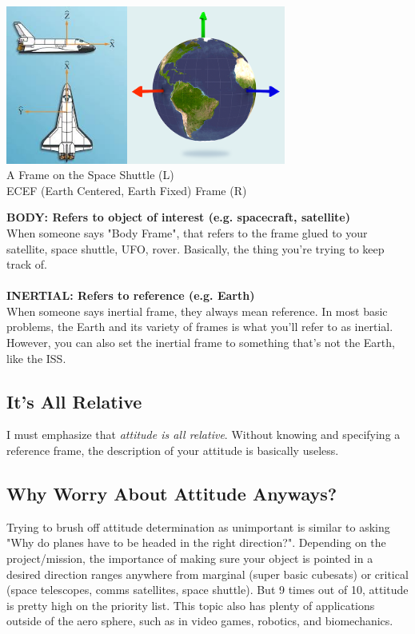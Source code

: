 \documentclass[a4paper,14pt]{extreport}
\begin{document}
\begin{center}
\includegraphics[width=4cm]{shuttle_body_frame}\includegraphics[height=5.2cm]{ecef}\\
A Frame on the Space Shuttle (L) \\ ECEF (Earth Centered, Earth Fixed) Frame (R)
\end{center}
\textbf{BODY: Refers to object of interest (e.g. spacecraft, satellite)}\\
When someone says "Body Frame", that refers to the frame glued to your satellite, space shuttle, UFO, rover. Basically, the thing you're trying to keep track of.\\\\
\textbf{INERTIAL: Refers to reference (e.g. Earth)}\\
When someone says inertial frame, they always mean reference. In most basic problems, the Earth and its variety of frames is what you'll refer to as inertial. However, you can also set the inertial frame to something that's not the Earth, like the ISS.\\

\subsection{It's All Relative}
I must emphasize that \emph{attitude is all relative}. Without knowing and specifying a reference frame, the description of your attitude is basically useless. 

\subsection{Why Worry About Attitude Anyways?}
Trying to brush off attitude determination as unimportant is similar to asking "Why do planes have to be headed in the right direction?". Depending on the project/mission, the importance of making sure your object is pointed in a desired direction ranges anywhere from marginal (super basic cubesats) or critical (space telescopes, comms satellites, space shuttle). But 9 times out of 10, attitude is pretty high on the priority list. This topic also has plenty of applications outside of the aero sphere, such as in video games, robotics, and biomechanics.
\end{document}
